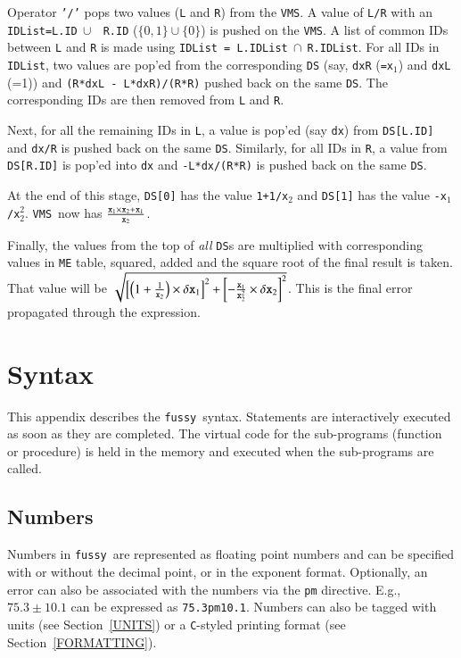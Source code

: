 \documentclass[11pt]{article}
\newcommand{\Fussy}{{\tt fussy}}
\newcommand{\VMS}{{\tt VMS}}
\begin{document}
\begin{enumerate}
  Operator {\tt '/'} pops two values ({\tt L} and {\tt R}) from the
  \VMS.  A value of {\tt L/R} with an {\tt IDList=L.ID}$~\cup~${\tt
  R.ID} ($\{0,1\}\cup\{0\}$) is pushed on the \VMS.  A list of common
  IDs between {\tt L} and {\tt R} is made using {\tt IDList =
  L.IDList}$~\cap~${\tt R.IDList}.  For all IDs in {\tt IDList}, two
  values are pop'ed from the corresponding {\tt DS} (say, {\tt dxR}
  ({\tt =x$_1$}) and {\tt dxL} (=1)) and {\tt (R*dxL -
  L*dxR)/(R*R)} pushed back on the same {\tt DS}.  The corresponding
  IDs are then removed from {\tt L} and {\tt R}.
  
  Next, for all the remaining IDs in {\tt L}, a value is pop'ed (say
  {\tt dx}) from {\tt DS[L.ID]} and {\tt dx/R} is pushed back on the
  same {\tt DS}.  Similarly, for all IDs in {\tt R}, a value from {\tt
  DS[R.ID]} is pop'ed into {\tt dx} and {\tt -L*dx/(R*R)} is pushed
  back on the same {\tt DS}.
  
  At the end of this stage, {\tt DS[0]} has the value {\tt 1+1/x$_2$}
  and {\tt DS[1]} has the value {\tt -x$_1$/x$_2^2$}.  \VMS\ now has
  ${{\tt x}_1 \times {\tt x}_2 + {\tt x}_1 \over {\tt x}_2}$.
       
\end{enumerate}

Finally, the values from the top of {\it all} {\tt DS}s are multiplied
with corresponding values in {\tt ME} table, squared, added and the
square root of the final result is taken.  That value will be
$\sqrt{\left[\left(1+{1\over {\tt x}_2}\right) \times \delta {\tt
x}_1\right]^2+\left[-{{\tt x}_1 \over {\tt x}_2^2} \times \delta {\tt
x}_2\right]^2}$.  This is the final error propagated through the
expression.

\section{Syntax}
\label{APPEN:SYNTAX}

This appendix describes the \Fussy\ syntax.  Statements are
interactively executed as soon as they are completed.  The virtual
code for the sub-programs (function or procedure) is held in the
memory and executed when the sub-programs are called.

\subsection{Numbers}
\label{NUMBERS}
Numbers in \Fussy\ are represented as floating point numbers and can
be specified with or without the decimal point, or in the exponent
format.  Optionally, an error can also be associated with the numbers
via the {\tt pm} directive.  E.g., $75.3\pm 10.1$ can be expressed as
{\tt 75.3pm10.1}.  Numbers can also be tagged with units (see
Section~\ref{UNITS}) or a {\tt C}-styled printing format (see
Section~\ref{FORMATTING}).
\end{document}

